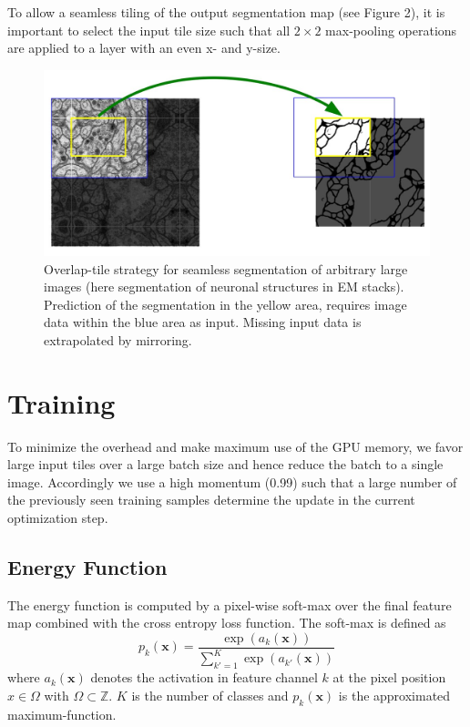 \documentclass[a4paper,12pt]{article}
\begin{document}
To allow a seamless tiling of the output segmentation map (see Figure 2), it is important to select the input tile size such that all $2 \times 2$ max-pooling operations are applied to a layer with an even x- and y-size.

\begin{figure}[ht]
	\includegraphics[width=\columnwidth]{img/overlap-tile.jpg}
	\caption{Overlap-tile strategy for seamless segmentation of arbitrary large images (here segmentation of neuronal structures in EM stacks). Prediction of the segmentation in the yellow area, requires image data within the blue area as input. Missing input data is extrapolated by mirroring.}
\end{figure}

\section{Training}

To minimize the overhead and make maximum use of the GPU memory, we favor large input tiles over a large batch size and hence reduce the batch to a single image. Accordingly we use a high momentum (0.99) such that a large number of the previously seen training samples determine the update in the current optimization step.

\subsection{Energy Function}

The energy function is computed by a pixel-wise soft-max over the final feature map combined with the cross entropy loss function. The soft-max is defined as \[p_k(\mathbf{x}) = \frac{\exp(a_k(\mathbf{x}))}{\sum_{k'=1}^K{\exp(a_{k'}(\mathbf{x}))}}\] where $a_k(\mathbf{x})$ denotes the activation in feature channel $k$ at the pixel position $x \in \Omega$ with $\Omega \subset \mathbb{Z}$. $K$ is the number of classes and $p_k(\mathbf{x})$ is the approximated maximum-function.
\end{document}
